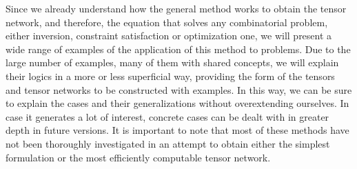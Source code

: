 Since we already understand how the general method works to obtain the tensor network, and therefore, the equation that solves any combinatorial problem, either inversion, constraint satisfaction or optimization one, we will present a wide range of examples of the application of this method to problems. Due to the large number of examples, many of them with shared concepts, we will explain their logics in a more or less superficial way, providing the form of the tensors and tensor networks to be constructed with examples. In this way, we can be sure to explain the cases and their generalizations without overextending ourselves. In case it generates a lot of interest, concrete cases can be dealt with in greater depth in future versions. It is important to note that most of these methods have not been thoroughly investigated in an attempt to obtain either the simplest formulation or the most efficiently computable tensor network.